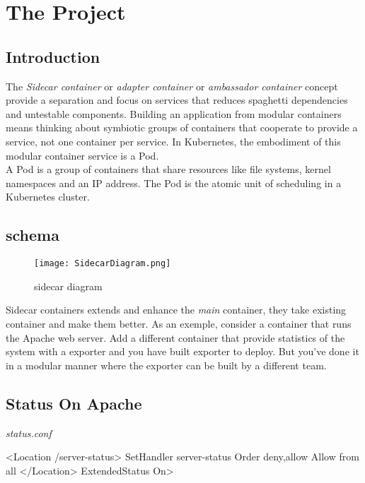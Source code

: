 \section{The Project}

\subsection{Introduction}

The \emph{Sidecar container} or \emph{adapter container} or \emph{ambassador container} concept provide a separation and focus on services that reduces spaghetti dependencies and untestable components. Building an application from modular containers means thinking about symbiotic groups of containers that cooperate to provide a service, not one container per service. In Kubernetes, the embodiment of this modular container service is a Pod.\\

A Pod is a group of containers that share resources like file systems, kernel namespaces and an IP address. The Pod is the atomic unit of scheduling in a Kubernetes cluster.

\subsection{schema}

\begin{figure}[ht]
  \caption{sidecar diagram}
  \centering
  \texttt{[image: SidecarDiagram.png]}
  \label{fig:SidecarDiagram}
\end{figure}

Sidecar containers extends and enhance the \emph{main} container, they take existing container and make them better. As an exemple, consider a container that runs the Apache web server. Add a different container that provide statistics of the system with a exporter and you have built exporter to deploy. But you've done it in a modular manner where the exporter can be built by a different team.

\subsection{Status On Apache}

\emph{status.conf}
\begin{apachecode}
  <Location /server-status>
  SetHandler server-status
  Order deny,allow
  Allow from all
  </Location> ExtendedStatus On>
\end{apachecode}

